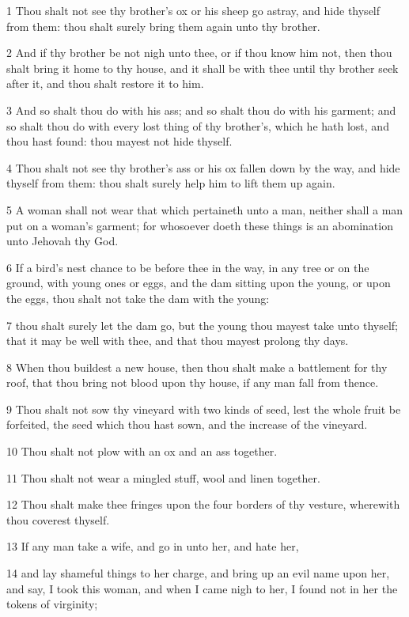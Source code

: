 \par 1 Thou shalt not see thy brother's ox or his sheep go astray, and hide thyself from them: thou shalt surely bring them again unto thy brother.
\par 2 And if thy brother be not nigh unto thee, or if thou know him not, then thou shalt bring it home to thy house, and it shall be with thee until thy brother seek after it, and thou shalt restore it to him.
\par 3 And so shalt thou do with his ass; and so shalt thou do with his garment; and so shalt thou do with every lost thing of thy brother's, which he hath lost, and thou hast found: thou mayest not hide thyself.
\par 4 Thou shalt not see thy brother's ass or his ox fallen down by the way, and hide thyself from them: thou shalt surely help him to lift them up again.
\par 5 A woman shall not wear that which pertaineth unto a man, neither shall a man put on a woman's garment; for whosoever doeth these things is an abomination unto Jehovah thy God.
\par 6 If a bird's nest chance to be before thee in the way, in any tree or on the ground, with young ones or eggs, and the dam sitting upon the young, or upon the eggs, thou shalt not take the dam with the young:
\par 7 thou shalt surely let the dam go, but the young thou mayest take unto thyself; that it may be well with thee, and that thou mayest prolong thy days.
\par 8 When thou buildest a new house, then thou shalt make a battlement for thy roof, that thou bring not blood upon thy house, if any man fall from thence.
\par 9 Thou shalt not sow thy vineyard with two kinds of seed, lest the whole fruit be forfeited, the seed which thou hast sown, and the increase of the vineyard.
\par 10 Thou shalt not plow with an ox and an ass together.
\par 11 Thou shalt not wear a mingled stuff, wool and linen together.
\par 12 Thou shalt make thee fringes upon the four borders of thy vesture, wherewith thou coverest thyself.
\par 13 If any man take a wife, and go in unto her, and hate her,
\par 14 and lay shameful things to her charge, and bring up an evil name upon her, and say, I took this woman, and when I came nigh to her, I found not in her the tokens of virginity;
